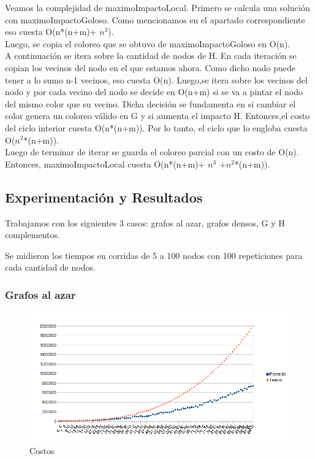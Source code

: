 \indent Veamos la complejidad de maximoImpactoLocal. Primero se calcula una solución con maximoImpactoGoloso. Como mencionamos en el apartado correspondiente eso cuesta O(n*(n+m)+ $n^{3}$). \\
\indent Luego, se copia el coloreo que se obtuvo de maximoImpactoGoloso en O(n).\\
\indent A continuación se itera sobre la cantidad de nodos de H. En cada iteración se copian los vecinos del nodo en el que estamos ahora. Como dicho nodo puede tener a lo sumo n-1 vecinos, eso cuesta O(n). Luego,se itera sobre los vecinos del nodo y por cada vecino del nodo se decide en O(n+m) si se va a pintar el nodo del mismo color que su vecino. Dicha decisión se fundamenta en si cambiar el color genera un coloreo válido en G y si aumenta el impacto H. Entonces,el costo del ciclo interior cuesta O(n*(n+m)). Por lo tanto, el ciclo que lo engloba cuesta O($n^{2}$*(n+m)).\\
\indent Luego de terminar de iterar se guarda el coloreo parcial con un costo de O(n).\\
\indent Entonces, maximoImpactoLocal cuesta O(n*(n+m)+ $n^{3}$ +$ n^{2}$*(n+m)).\\

\subsection{Experimentación y Resultados}
\quad Trabajamos con los siguientes 3 casos: grafos al azar, grafos densos, G y H complementos.

\quad Se midieron los tiempos en corridas de  5 a 100 nodos con 100 repeticiones para cada cantidad de nodos.

\subsubsection{Grafos al azar}

\begin{figure}[H]
	\centering
	\includegraphics[scale=0.8]{BLocal-tiempos-Azar.png}
\caption{Costos}
\end{figure}

